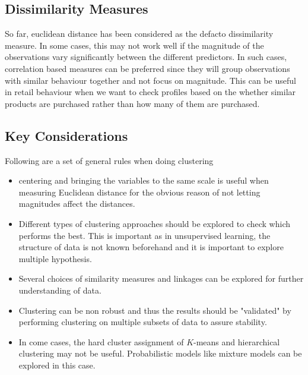 \documentclass[../statistical_learning_notes.tex]{subfiles}
\begin{document}
    \subsection{Dissimilarity Measures}
    So far, euclidean distance has been considered as the defacto dissimilarity measure. In some cases, this may not work well if the magnitude of the observations vary significantly between the different predictors. In such cases, correlation based measures can be preferred since they will group observations with similar behaviour together and not focus on magnitude.\newline
    This can be useful in retail behaviour when we want to check profiles based on the whether similar products are purchased rather than how many of them are purchased.


    \subsection{Key Considerations}
    Following are a set of general rules when doing clustering
    \begin{itemize}
        \item centering and bringing the variables to the same scale is useful when measuring Euclidean distance for the obvious reason of not letting magnitudes affect the distances.
        \item Different types of clustering approaches should be explored to check which performs the best. This is important as in unsupervised learning, the structure of data is not known beforehand and it is important to explore multiple hypothesis.
        \item Several choices of similarity measures and linkages can be explored for further understanding of data.
        \item Clustering can be non robust and thus the results should be "validated" by performing clustering on multiple subsets of data to assure stability.
        \item In come cases, the hard cluster assignment of $K$-means and hierarchical clustering may not be useful. Probabilistic models like mixture models can be explored in this case.
    \end{itemize}
\end{document}
